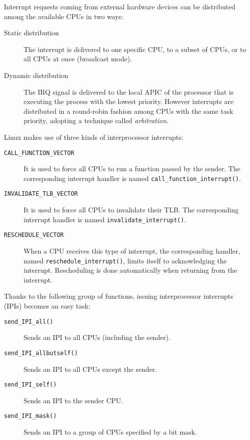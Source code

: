 \documentclass[10pt,a4paper]{article}
\begin{document}
Interrupt requests coming from external hardware devices can be distributed among the available CPUs in two ways:
\begin{description}
\item[Static distribution] The interrupt is delivered to one specific CPU, to a subset of CPUs, or to all CPUs at once (broadcast mode).
\item[Dynamic distribution] The IRQ signal is delivered to the local APIC of the processor that is executing the process with the lowest priority. However interrupts are distributed in a round-robin fashion among CPUs with the same task priority, adopting a technique called \textit{arbitration}.
\end{description}



Linux makes use of three kinds of interprocessor interrupts:

\begin{description}
\item[\texttt{CALL\_FUNCTION\_VECTOR}] It is used to force all CPUs to run a function passed by the sender. The corresponding interrupt handler is named \texttt{call\_function\_interrupt()}. 
\item[\texttt{INVALIDATE\_TLB\_VECTOR}] It is used to force all CPUs to invalidate their TLB. The corresponding interrupt handler is named \texttt{invalidate\_interrupt()}. 
\item[\texttt{RESCHEDULE\_VECTOR}] When a CPU receives this type of interrupt, the corresponding handler, named \texttt{reschedule\_interrupt()}, limits itself to acknowledging the interrupt. Rescheduling is done automatically when returning from the interrupt.
\end{description}

Thanks to the following group of functions, issuing interprocessor interrupts (IPIs) becomes an easy task:

\begin{description}
\item[\texttt{send\_IPI\_all()}] Sends an IPI to all CPUs (including the sender).
\item[\texttt{send\_IPI\_allbutself()}] Sends an IPI to all CPUs except the sender.
\item[\texttt{send\_IPI\_self()}] Sends an IPI to the sender CPU.
\item[\texttt{send\_IPI\_mask()}] Sends an IPI to a group of CPUs specified by a bit mask.
\end{description}
\end{document}
